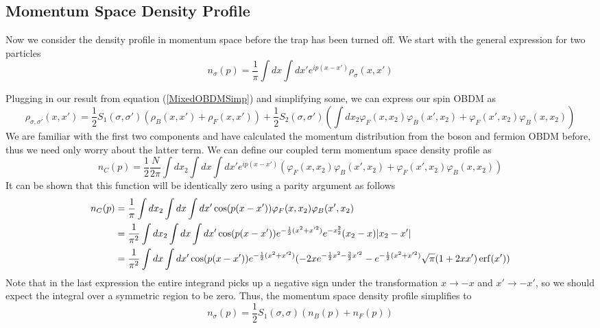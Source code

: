 \documentclass[onecolumn,english,aps,pra]{revtex4}
\begin{document}
\subsection{Momentum Space Density Profile}

Now we consider the density profile in momentum space before the trap has been turned off. We start with the general expression for two particles
\begin{equation}
n_{\sigma}(p) = \frac{1}{\pi} \int dx \int dx' e^{ip(x-x')} \rho_{\sigma}(x,x')
\end{equation}

Plugging in our result from equation (\ref{MixedOBDMSimp}) and simplifying some, we can express our spin OBDM as
\begin{equation}
\rho_{\sigma, \sigma'}(x,x') = \frac{1}{2}S_1(\sigma, \sigma')(\rho_B(x,x') + \rho_F(x,x')) + \frac{1}{2}S_2(\sigma, \sigma')(\int dx_2 \varphi_F(x,x_2)\varphi_B(x',x_2) + \varphi_F(x',x_2)\varphi_B(x,x_2))
\end{equation}
We are familiar with the first two components and have calculated the momentum distribution from the boson and fermion OBDM before, thus we need only worry about the latter term. We can define our coupled term momentum space density profile as 
\begin{equation}
n_C(p) = \frac{1}{2}\frac{N}{2\pi}\int dx_2  \int dx \int dx' e^{ip(x-x')}(\varphi_F(x,x_2)\varphi_B(x',x_2) + \varphi_F(x',x_2)\varphi_B(x,x_2))
\label{ncInitMom}
\end{equation}
It can be shown that this function will be identically zero using a parity argument as follows
\begin{align*}
n_C(p) & = \frac{1}{\pi}\int dx_2  \int dx \int dx' \cos(p(x-x'))\varphi_F(x,x_2)\varphi_B(x',x_2) \\
& = \frac{1}{\pi^2}\int dx_2  \int dx \int dx' \cos(p(x-x')) e^{-\frac{1}{2} (x^2 + x'^2)} e^{-x_2^2} (x_2 -x) |x_2 - x'|\\
& = \frac{1}{\pi^2} \int dx \int dx' \cos(p(x-x')) e^{-\frac{1}{2} (x^2 + x'^2)} 
(-2x e^{-\frac{1}{2}x^2 -\frac{3}{2}x'^2} - e^{-\frac{1}{2}(x^2 + x'^2)}\sqrt{\pi} (1+2xx')\erf(x'))
\end{align*}
Note that in the last expression the entire integrand picks up a negative sign under the transformation $x \rightarrow -x$ and $x' \rightarrow -x'$, so we should expect the integral over a symmetric region to be zero. Thus, the momentum space density profile simplifies to
\begin{equation}
n_{\sigma}(p) =  \frac{1}{2}S_1(\sigma, \sigma)(n_B(p) + n_F(p))
\end{equation}
\end{document}
